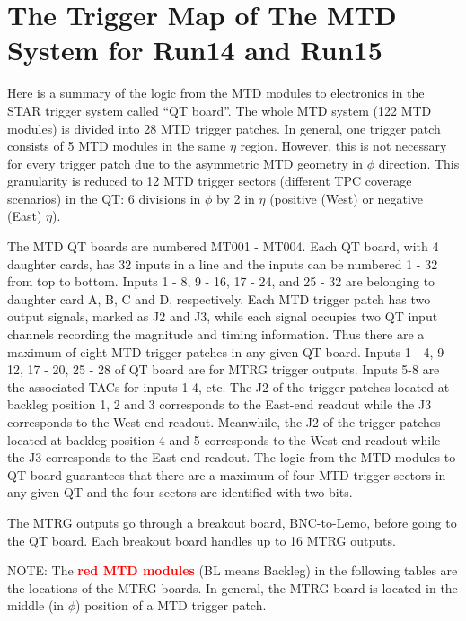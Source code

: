 ﻿\chapter{The Trigger Map of The MTD System for Run14 and Run15}
\label{chap:mtdtrgmap}

Here is a summary of the logic from the MTD modules to electronics in the STAR trigger system called ``QT board''. The whole MTD system (122 MTD modules) is divided into 28 MTD trigger patches. In general, one trigger patch consists of 5 MTD modules in the same $\eta$ region. However, this is not necessary for every trigger patch due to the asymmetric MTD geometry in $\phi$ direction. This granularity is reduced to 12 MTD trigger sectors (different TPC coverage scenarios) in the QT: 6 divisions in $\phi$ by 2 in $\eta$ (positive (West) or negative (East) $\eta$).

The MTD QT boards are numbered MT001 - MT004. Each QT board, with 4 daughter cards, has 32 inputs in a line and the inputs can be numbered 1 - 32 from top to bottom. Inputs 1 - 8, 9 - 16, 17 - 24, and 25 - 32 are belonging to daughter card A, B, C and D, respectively. Each MTD trigger patch has two output signals, marked as J2 and J3, while each signal occupies two QT input channels recording the magnitude and timing information. Thus there are a maximum of eight MTD trigger patches in any given QT board. Inputs 1 - 4, 9 - 12, 17 - 20, 25 - 28 of QT board are for MTRG trigger outputs. Inputs 5-8 are the associated TACs for inputs 1-4, etc. The J2 of the trigger patches located at backleg position 1, 2 and 3 corresponds to the East-end readout while the J3 corresponds to the West-end readout. Meanwhile, the J2 of the trigger patches located at backleg position 4 and 5 corresponds to the West-end readout while the J3 corresponds to the East-end readout. The logic from the MTD modules to QT board guarantees that there are a maximum of four MTD trigger sectors in any given QT and the four sectors are identified with two bits.

The MTRG outputs go through a breakout board, BNC-to-Lemo, before going to the QT board. Each breakout board handles up to 16 MTRG outputs.

NOTE: The \textcolor{red}{\textbf{red MTD modules}} (BL means Backleg) in the following tables are the locations of the MTRG boards. In general, the MTRG board is located in the middle (in $\phi$) position of a MTD trigger patch. 

